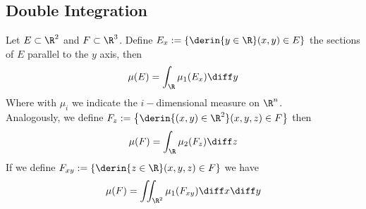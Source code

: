 \documentclass[../mmf.tex]{subfiles}
\begin{document}
\subsection{Double Integration}
\begin{thm}
	Let $E\subset\R^2$ and $F\subset\R^3$. Define $E_x:=\left\{ \derin{y\in\R}(x,y)\in E \right\}$ the sections of $E$ parallel to the $y$ axis, then
	\begin{equation}
		\mu(E)=\int_{\R}^{}\mu_1(E_x)\diff y
		\label{eq:doubleint1}
	\end{equation}
	Where with $\mu_i$ we indicate the $i-$dimensional measure on $\R^n$.\\
	Analogously, we define $F_z:=\left\{ \derin{(x,y)\in\R^2}(x,y,z)\in F \right\}$ then
	\begin{equation}
		\mu(F)=\int_{\R}^{}\mu_2(F_z)\diff z
		\label{eq:tripleint1}
	\end{equation}
	If we define $F_{xy}:=\left\{ \derin{z\in\R}(x,y,z)\in F \right\}$ we have
	\begin{equation}
		\mu(F)=\iint_{\R^2}\mu_1(F_{xy})\diff x\diff y
		\label{eq:tripleint2}
	\end{equation}
\end{thm}
\end{document}
